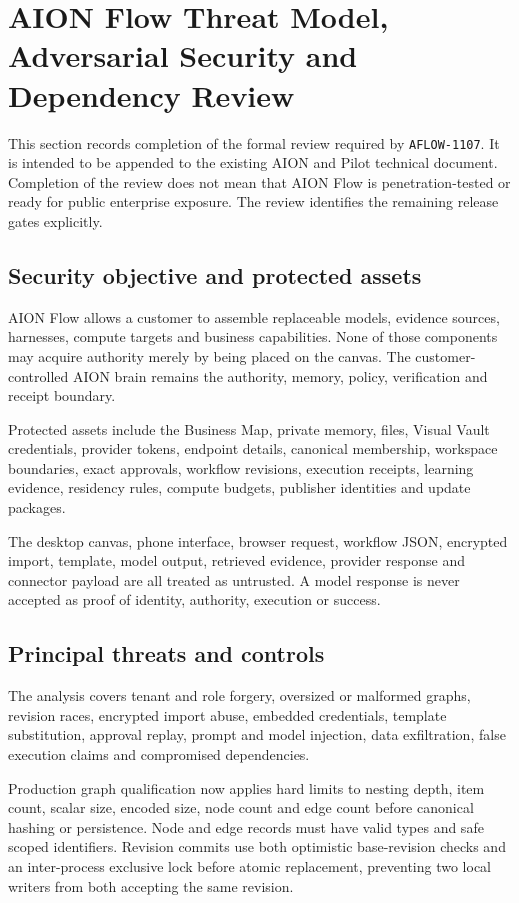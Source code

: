 \section{AION Flow Threat Model, Adversarial Security and Dependency Review}
\label{sec:aion-flow-threat-model}

This section records completion of the formal review required by \texttt{AFLOW-1107}. It is
intended to be appended to the existing AION and Pilot technical document. Completion of the
review does not mean that AION Flow is penetration-tested or ready for public enterprise
exposure. The review identifies the remaining release gates explicitly.

\subsection{Security objective and protected assets}

AION Flow allows a customer to assemble replaceable models, evidence sources, harnesses, compute
targets and business capabilities. None of those components may acquire authority merely by being
placed on the canvas. The customer-controlled AION brain remains the authority, memory, policy,
verification and receipt boundary.

Protected assets include the Business Map, private memory, files, Visual Vault credentials,
provider tokens, endpoint details, canonical membership, workspace boundaries, exact approvals,
workflow revisions, execution receipts, learning evidence, residency rules, compute budgets,
publisher identities and update packages.

The desktop canvas, phone interface, browser request, workflow JSON, encrypted import, template,
model output, retrieved evidence, provider response and connector payload are all treated as
untrusted. A model response is never accepted as proof of identity, authority, execution or
success.

\subsection{Principal threats and controls}

The analysis covers tenant and role forgery, oversized or malformed graphs, revision races,
encrypted import abuse, embedded credentials, template substitution, approval replay, prompt and
model injection, data exfiltration, false execution claims and compromised dependencies.

Production graph qualification now applies hard limits to nesting depth, item count, scalar size,
encoded size, node count and edge count before canonical hashing or persistence. Node and edge
records must have valid types and safe scoped identifiers. Revision commits use both optimistic
base-revision checks and an inter-process exclusive lock before atomic replacement, preventing two
local writers from both accepting the same revision.

